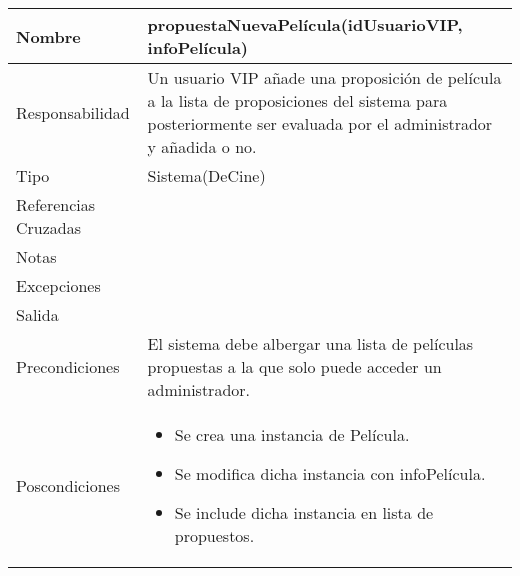 \documentclass{article}
\begin{document}
\begin{table}[h]
\begin{tabular}{|l|l|l|l|l|l|}
\hline
\multicolumn{2}{|p{3cm}|}{Nombre} & \multicolumn{4}{p{10cm}|}{\textbf{propuestaNuevaPelícula(idUsuarioVIP, infoPelícula)}}\\
\hline
\multicolumn{2}{|p{3cm}|}{Responsabilidad} & \multicolumn{4}{p{10cm}|}{Un usuario VIP añade una proposición de película a la lista de proposiciones del sistema para posteriormente ser evaluada por el administrador y añadida o no.} \\
\hline
\multicolumn{2}{|p{3cm}|}{Tipo} & \multicolumn{4}{p{10cm}|}{Sistema(DeCine)} \\
\hline
\multicolumn{2}{|p{3cm}|}{Referencias Cruzadas} & \multicolumn{4}{p{10cm}|}{} \\
\hline
\multicolumn{2}{|p{3cm}|}{Notas} & \multicolumn{4}{p{10cm}|}{} \\
\hline
\multicolumn{2}{|p{3cm}|}{Excepciones} & \multicolumn{4}{p{10cm}|}{} \\
\hline
\multicolumn{2}{|p{3cm}|}{Salida} & \multicolumn{4}{p{10cm}|}{} \\
\hline
\multicolumn{2}{|p{3cm}|}{Precondiciones} & \multicolumn{4}{p{10cm}|}{El sistema debe albergar una lista de películas propuestas a la que solo puede acceder un administrador.} \\
\hline
\multicolumn{2}{|p{3cm}|}{Poscondiciones} & \multicolumn{4}{p{10cm}|}{\begin{itemize}
\item Se crea una instancia de Película.
\item Se modifica dicha instancia con infoPelícula.
\item Se include dicha instancia en lista de propuestos.
\end{itemize}} \\
\hline
\end{tabular}
\end{table}
\end{document}
